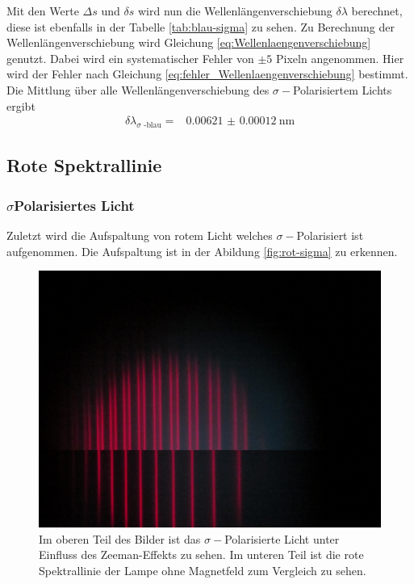 Mit den Werte $\Delta s$ und $\delta s$ wird nun die Wellenlängenverschiebung $\delta \lambda$ berechnet, diese ist ebenfalls in der Tabelle \autoref{tab:blau-sigma} zu sehen.
Zu Berechnung der Wellenlängenverschiebung wird Gleichung \eqref{eq:Wellenlaengenverschiebung} genutzt.
Dabei wird ein systematischer Fehler von $\pm 5$ Pixeln angenommen. 
Hier wird der Fehler nach Gleichung \eqref{eq:fehler_Wellenlaengenverschiebung} bestimmt.
Die Mittlung über alle Wellenlängenverschiebung des $\sigma -$Polarisiertem Lichts ergibt
\begin{align*}
    \delta \lambda _\text{$\sigma$ -blau} =& \SI{0.00621(012)}{\nano\meter}
\end{align*}

\subsection{Rote Spektrallinie}
\subsubsection{\texorpdfstring{$\sigma$}-Polarisiertes Licht}
Zuletzt wird die Aufspaltung von rotem Licht welches $\sigma -$Polarisiert ist aufgenommen.
Die Aufspaltung ist in der Abildung \autoref{fig:rot-sigma} zu erkennen.

\begin{figure}
    \centering
    \includegraphics[width=\textwidth]{content/data/Rot_0_sigma_uebernander.JPG}
    \caption{Im oberen Teil des Bilder ist das $\sigma -$Polarisierte Licht unter Einfluss des Zeeman-Effekts zu sehen. Im unteren Teil ist die rote Spektrallinie der Lampe ohne Magnetfeld zum Vergleich zu sehen.}
    \label{fig:rot-sigma}
\end{figure}

